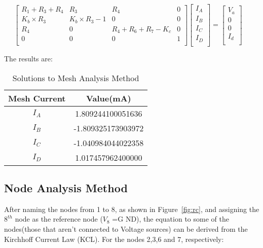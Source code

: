 $$
\begin{bmatrix}
R_1+R_3+R_4       &   R_3       & R_4     &   0       \\
K_b \times R_3       &   K_b \times R_3-1       & 0    &   0      \\
R_4  &  0  &   R_4+R_6+R_7-K_c  &   0 \\
0       &   0      & 0    &   1      \\
\end{bmatrix}
\begin{bmatrix}
I_A     \\
I_B    \\
I_C   \\
I_D     \\
\end{bmatrix}
=
\begin{bmatrix}
V_a   \\
0    \\
0  \\
I_d   \\
\end{bmatrix}
\quad
$$


The results are:

\begin{table}[h]


\label{tab:tables}
\begin{center}
\begin{tabular}{|c|c|}
 \hline
  Mesh Current & Value\hspace{1mm}(mA)\\
 \hline
 $I_{A}$ & 1.809244100051636 \\
 \hline
 $I_{B}$ &-1.809325173903972\\
 \hline
 $I_{C}$ &-1.040984044022358\\
 \hline
 $I_{D}$ &1.017457962400000\\
 \hline
\end{tabular}
\caption{Solutions to Mesh Analysis Method}
\label{table:tab2}
\end{center}
\end{table}

\subsection{Node Analysis Method}

After naming the nodes from 1 to 8, as shown in Figure~\ref{fig:rc}, and assigning the $8^{th}$ node as the reference node ($V_{8}$ =G ND), the equation to some of the nodes(those that aren't connected to Voltage sources) can be derived from the  Kirchhoff Current Law (KCL).
For the nodes 2,3,6 and 7, respectively:

